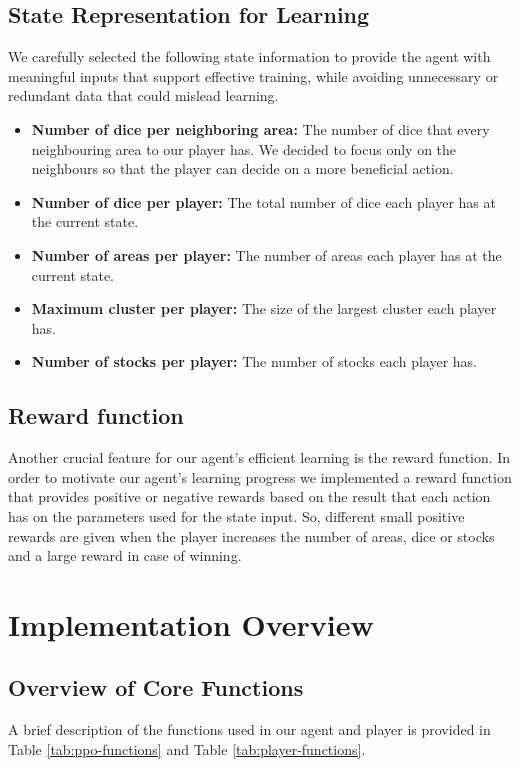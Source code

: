 \documentclass{article}
\begin{document}
\subsection{State Representation for Learning}
We carefully selected the following state information to provide the agent with meaningful inputs that support effective training, while avoiding unnecessary or redundant data that could mislead learning.

\begin{itemize}
    \item \textbf{Number of dice per neighboring area:} The number of dice that every neighbouring area to our player has. We decided to focus only on the neighbours so that the player can decide on a more beneficial action.
    \item \textbf{Number of dice per player:} The total number of dice each player has at the current state.
    \item \textbf{Number of areas per player:} The number of areas each player has at the current state.
    \item \textbf{Maximum cluster per player:} The size of the largest cluster each player has.
    \item \textbf{Number of stocks per player:} The number of stocks each player has.
\end{itemize}


\subsection{Reward function}
Another crucial feature for our agent's efficient learning is the reward function. In order to motivate our agent's learning progress we implemented a reward function that provides positive or negative rewards based on the result that each action has on the parameters used for the state input. So, different small positive rewards are given when the player increases the number of areas, dice or stocks and a large reward in case of winning.  

\section{Implementation Overview}



\subsection{Overview of Core Functions}
A brief description of the functions used in our agent and player is provided in Table \ref{tab:ppo-functions} and Table \ref{tab:player-functions}.
\end{document}
